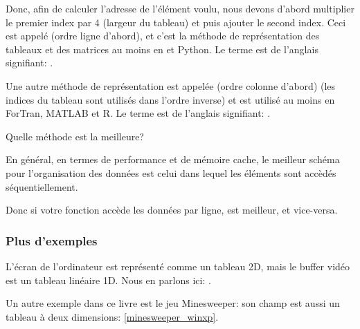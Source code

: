 
Donc, afin de calculer l'adresse de l'élément voulu, nous devons d'abord multiplier
le premier index par 4 (largeur du tableau) et puis ajouter le second index.
Ceci est appelé  (ordre ligne d'abord),
et c'est la méthode de représentation des tableaux et des matrices au moins en \CCpp
et Python.
Le terme  est de l'anglais signifiant: .

Une autre méthode de représentation est appelée  (ordre colonne
d'abord) (les indices du tableau sont utilisés dans l'ordre inverse) et est utilisé
au moins en ForTran, MATLAB et R.
Le terme  est de l'anglais signifiant: .

Quelle méthode est la meilleure?

En général, en termes de performance et de mémoire cache, le meilleur schéma pour
l'organisation des données est celui dans lequel les éléments sont accèdés séquentiellement.

Donc si votre fonction accède les données par ligne,  est meilleur,
et vice-versa.





\subsubsection{Plus d'exemples}

L'écran de l'ordinateur est représenté comme un tableau 2D, mais le buffer vidéo
est un tableau linéaire 1D.
Nous en parlons ici: .

Un autre exemple dans ce livre est le jeu Minesweeper: son champ est aussi un tableau
à deux dimensions: \ref{minesweeper_winxp}.

